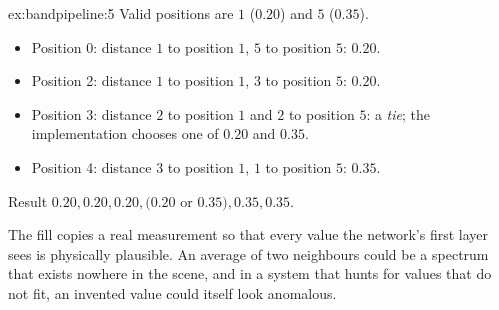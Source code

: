 \begin{solution}{ex:bandpipeline:5}
Valid positions are $1$ ($0.20$) and $5$ ($0.35$).
\begin{itemize}
\item Position 0: distance $1$ to position $1$, $5$ to position $5$: $0.20$.
\item Position 2: distance $1$ to position $1$, $3$ to position $5$: $0.20$.
\item Position 3: distance $2$ to position $1$ and $2$ to position $5$: a \emph{tie}; the
implementation chooses one of $0.20$ and $0.35$.
\item Position 4: distance $3$ to position $1$, $1$ to position $5$: $0.35$.
\end{itemize}
Result $0.20, 0.20, 0.20, \text{($0.20$ or $0.35$)}, 0.35, 0.35$.

The fill copies a real measurement so that every value the network's first layer sees is physically
plausible. An average of two neighbours could be a spectrum that exists nowhere in the scene, and in a
system that hunts for values that do not fit, an invented value could itself look anomalous.
\end{solution}
